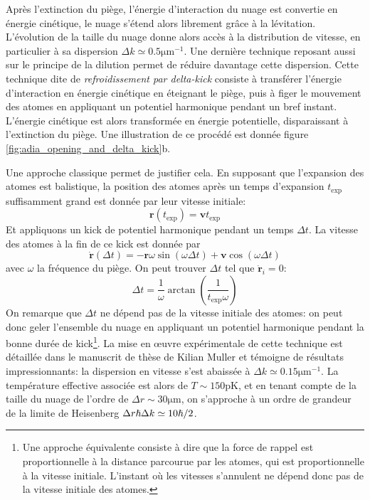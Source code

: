 Après l'extinction du piège, l'énergie d'interaction du nuage est convertie en énergie cinétique, le nuage s'étend alors librement grâce à la lévitation. L'évolution de la taille du nuage donne alors accès à la distribution de vitesse, en particulier à sa dispersion $\Delta k \simeq 0.5 \mathrm{\mu m^{-1}}$. Une dernière technique reposant aussi sur le principe de la dilution permet de réduire davantage cette dispersion. Cette technique dite de \emph{refroidissement par delta-kick} consiste à transférer l'énergie d'interaction en énergie cinétique en éteignant le piège, puis à figer le mouvement des atomes en appliquant un potentiel harmonique pendant un bref instant. L'énergie cinétique est alors transformée en énergie potentielle, disparaissant à l'extinction du piège. Une illustration de ce procédé est donnée figure \ref{fig:adia_opening_and_delta_kick}b.

Une approche classique permet de justifier cela. En supposant que l'expansion des atomes est balistique, la position des atomes après un temps d'expansion $t_{\mathrm{exp}}$ suffisamment grand est donnée par leur vitesse initiale:
\begin{equation}
\mathbf{r}(t_{\mathrm{exp}})=\mathbf{v} t_{\mathrm{exp}}
\end{equation}
Et appliquons un kick de potentiel harmonique pendant un temps $\Delta t$. La vitesse des atomes à la fin de ce kick est donnée par
\begin{equation}
\dot{\mathbf{r}}(\Delta t) = -\mathbf{r} \omega \sin{(\omega \Delta t)}+ \mathbf{v} \cos{(\omega \Delta t)}
\end{equation}
avec $\omega$ la fréquence du piège.
On peut trouver $\Delta t$ tel que $\dot{\mathbf{r}}_i=0$:
\begin{equation}
\Delta t= \frac{1}{\omega} \arctan{\left(\frac{1}{t_{\mathrm{exp}} \omega} \right)}
\end{equation}
On remarque que $\Delta t$ ne dépend pas de la vitesse initiale des atomes: on peut donc geler l'ensemble du nuage en appliquant un potentiel harmonique pendant la bonne durée de kick\footnote{Une approche équivalente consiste à dire que la force de rappel est proportionnelle à la distance parcourue par les atomes, qui est proportionnelle à la vitesse initiale. L'instant où les vitesses s'annulent ne dépend donc pas de la vitesse initiale des atomes.}. 
La mise en œuvre expérimentale de cette technique est détaillée dans le manuscrit de thèse de Kilian Muller \citep{muller2015coherent} et témoigne de résultats impressionnants: la dispersion en vitesse s'est abaissée à $\Delta k \simeq 0.15 \mathrm{\mu m^{-1}}$. La température effective associée est alors de $T\sim 150\mathrm{pK}$, et en tenant compte de la taille du nuage de l'ordre de $\Delta r \sim 30\mathrm{\mu m}$, on s'approche à un ordre de grandeur de la limite de Heisenberg $\Delta r \hslash \Delta k \simeq 10 \hslash /2$.

